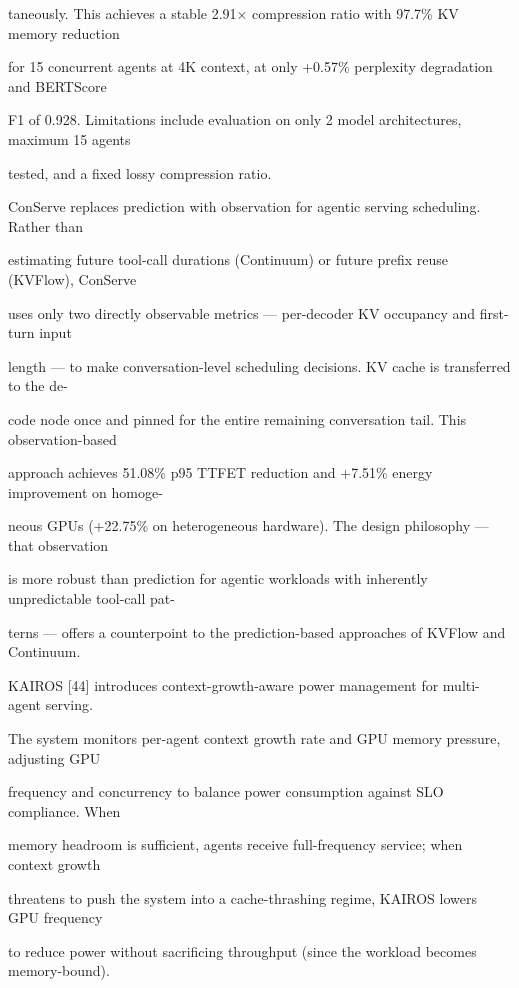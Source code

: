 \begin{flushleft}
\noindent taneously. This achieves a stable 2.91× compression ratio with 97.7\% KV memory reduction\par
\noindent for 15 concurrent agents at 4K context, at only +0.57\% perplexity degradation and BERTScore\par
\noindent F1 of 0.928. Limitations include evaluation on only 2 model architectures, maximum 15 agents\par
\noindent tested, and a fixed lossy compression ratio.\par
\noindent  ConServe replaces prediction with observation for agentic serving scheduling. Rather than\par
\noindent estimating future tool-call durations (Continuum) or future prefix reuse (KVFlow), ConServe\par
\noindent uses only two directly observable metrics — per-decoder KV occupancy and first-turn input\par
\noindent length — to make conversation-level scheduling decisions. KV cache is transferred to the de-\par
\noindent code node once and pinned for the entire remaining conversation tail. This observation-based\par
\noindent approach achieves 51.08\% p95 TTFET reduction and +7.51\% energy improvement on homoge-\par
\noindent neous GPUs (+22.75\% on heterogeneous hardware). The design philosophy — that observation\par
\noindent is more robust than prediction for agentic workloads with inherently unpredictable tool-call pat-\par
\noindent terns — offers a counterpoint to the prediction-based approaches of KVFlow and Continuum.\par
\noindent  KAIROS [44] introduces context-growth-aware power management for multi-agent serving.\par
\noindent The system monitors per-agent context growth rate and GPU memory pressure, adjusting GPU\par
\noindent frequency and concurrency to balance power consumption against SLO compliance. When\par
\noindent memory headroom is sufficient, agents receive full-frequency service; when context growth\par
\noindent threatens to push the system into a cache-thrashing regime, KAIROS lowers GPU frequency\par
\noindent to reduce power without sacrificing throughput (since the workload becomes memory-bound).\par

\end{flushleft}

